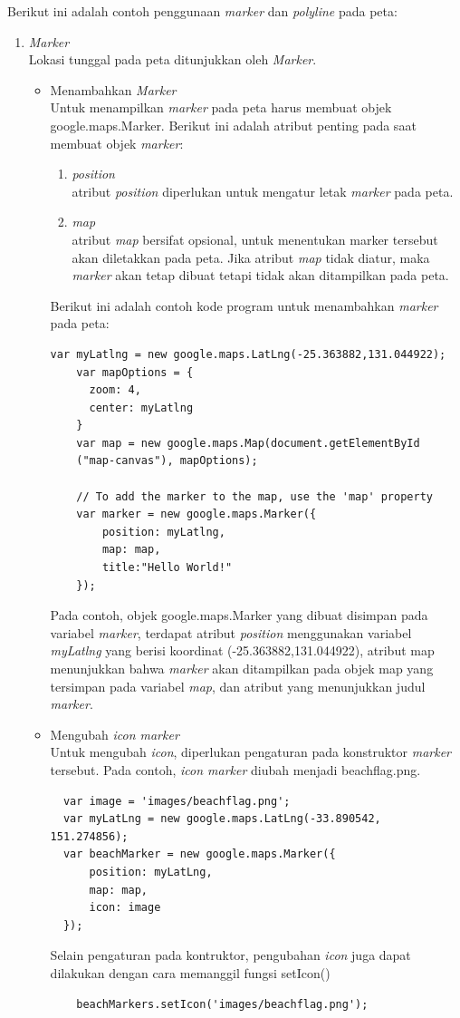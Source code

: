 Berikut ini adalah contoh penggunaan \textit{marker} dan \textit{polyline} pada
peta:
\begin{enumerate}
\item \textit{Marker} \\
Lokasi tunggal pada peta ditunjukkan oleh \textit{Marker}.
\begin{itemize}
  \item Menambahkan \textit{Marker} \\
  Untuk menampilkan \textit{marker} pada peta harus membuat objek
  google.maps.Marker. Berikut ini adalah atribut penting pada saat
  membuat objek \textit{marker}:
  \begin{enumerate}
    \item \textit{position} \\
    atribut \textit{position} diperlukan untuk mengatur letak \textit{marker}
    pada peta.
    
    \item \textit{map} \\
    atribut \textit{map} bersifat opsional, untuk menentukan marker
    tersebut akan diletakkan pada peta. Jika atribut \textit{map} tidak diatur,
    maka \textit{marker} akan tetap dibuat tetapi tidak akan ditampilkan pada
    peta.
  \end{enumerate}
  Berikut ini adalah contoh kode program untuk menambahkan \textit{marker} pada
  peta:
\begin{verbatim}
var myLatlng = new google.maps.LatLng(-25.363882,131.044922);
	var mapOptions = {
	  zoom: 4,
	  center: myLatlng
	}
	var map = new google.maps.Map(document.getElementById
	("map-canvas"), mapOptions);
	
	// To add the marker to the map, use the 'map' property
	var marker = new google.maps.Marker({
	    position: myLatlng,
	    map: map,
	    title:"Hello World!"
	});
\end{verbatim}
  Pada contoh, objek google.maps.Marker yang dibuat disimpan pada variabel
  \textit{marker}, terdapat atribut \textit{position} menggunakan variabel
  \textit{myLatlng} yang berisi koordinat (-25.363882,131.044922), atribut map
  menunjukkan bahwa \textit{marker} akan ditampilkan pada objek map yang tersimpan pada variabel
  \textit{map}, dan atribut yang menunjukkan judul \textit{marker}. 
  
  \item Mengubah \textit{icon marker}\\
  Untuk mengubah \textit{icon}, diperlukan pengaturan pada konstruktor
  \textit{marker} tersebut. Pada contoh, \textit{icon marker} diubah
  menjadi beachflag.png.
\begin{verbatim}
  var image = 'images/beachflag.png';
  var myLatLng = new google.maps.LatLng(-33.890542, 151.274856);
  var beachMarker = new google.maps.Marker({
      position: myLatLng,
      map: map,
      icon: image
  });
\end{verbatim}
Selain pengaturan pada kontruktor, pengubahan \textit{icon} juga dapat dilakukan
dengan cara memanggil fungsi setIcon()
\begin{verbatim}
	beachMarkers.setIcon('images/beachflag.png');
\end{verbatim}


\end{itemize}
\end{enumerate}
